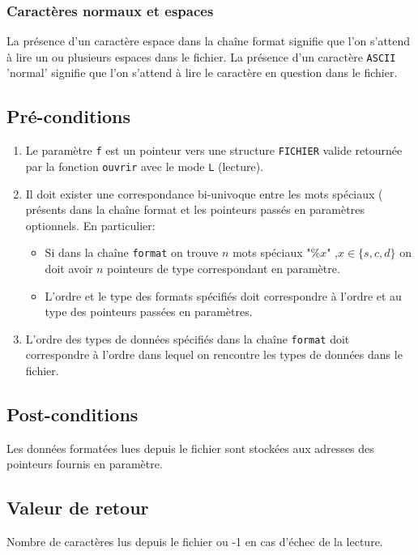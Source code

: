 \documentclass[11pt]{article}
\theoremstyle{definition}
\theoremstyle{definition}
\begin{document}
\subsubsection{Caractères normaux et espaces}
La présence d'un caractère espace dans la chaîne format signifie que l'on
s'attend à lire un ou plusieurs espaces dans le fichier.
La présence d'un caractère \texttt{ASCII} 'normal' signifie que l'on s'attend à lire
le caractère en question dans le fichier.

\subsection{Pré-conditions}
\begin{enumerate}
    \item Le paramètre \texttt{f} est un pointeur vers une structure \texttt{FICHIER} valide retournée par
      la fonction \texttt{ouvrir} avec le mode \texttt{L} (lecture).
    \item Il doit exister une correspondance bi-univoque entre les mots spéciaux (%
      présents dans la chaîne format et les pointeurs passés en paramètres optionnels.
      En particulier:
      \begin{itemize}
      \item Si dans la chaîne \texttt{format} on trouve $n$ mots spéciaux "\%$x$" ,$x \in \{s,c,d\}$
      on doit avoir $n$ pointeurs de type correspondant en paramètre.
      \item L'ordre et le type des formats spécifiés doit correspondre à l'ordre et
      au type des pointeurs passées en paramètres.
      \end{itemize}
    \item L'ordre des types de données spécifiés dans la chaîne \texttt{format} doit correspondre
      à l'ordre dans lequel on rencontre les types de données dans le fichier.
\end{enumerate}

\subsection{Post-conditions}
Les données formatées lues depuis le fichier sont stockées aux adresses des
pointeurs fournis en paramètre.

\subsection{Valeur de retour}
Nombre de caractères lus depuis le fichier ou -1 en cas d'échec de la lecture.
\end{document}

